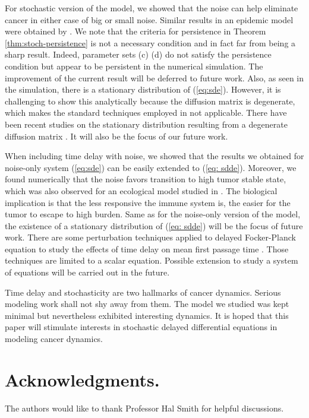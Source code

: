 \documentclass{aims}
\theoremstyle{definition}
\begin{document}
 For stochastic version of the model, we showed that the noise can
 help eliminate cancer in either case of big or small noise. Similar
 results in an epidemic model were obtained by \cite{Gray2011}. We
 note that the criteria for persistence in Theorem \ref{thm:stoch-persistence}
 is not a necessary condition and in fact far from being a sharp result.
 Indeed, parameter sets (c) (d) do not satisfy the persistence condition
 but appear to be persistent in the numerical simulation. The improvement
 of the current result will be deferred to future work. Also, as seen
 in the simulation, there is a stationary distribution of (\ref{eq:sde}).
 However, it is challenging to show this analytically because the diffusion
 matrix is degenerate, which makes the standard techniques employed
 in \cite{Wang2017,Gray2011} not applicable. There have been recent
 studies on the stationary distribution resulting from a degenerate
 diffusion matrix \cite{Lan2018}. It will also be the focus of our
 future work. 
 
 When including time delay with noise, we showed that the results we
 obtained for noise-only system (\ref{eq:sde}) can be easily extended
 to (\ref{eq: sdde}). Moreover, we found numerically that the noise
 favors transition to high tumor stable state, which was also observed
 for an ecological model studied in \cite{Zeng2012}. The biological
 implication is that the less responsive the immune system is, the
 easier for the tumor to escape to high burden. Same as for the noise-only
 version of the model, the existence of a stationary distribution of (\ref{eq: sdde}) will
 be the focus of future work. There are some perturbation techniques
 applied to delayed Focker-Planck equation to study the effects of
 time delay on mean first passage time \cite{Kuchler1992,Guillouzic1999,Frank2005}.
 Those techniques are limited to a scalar equation. Possible extension
 to study a system of equations will be carried out in the future. 
 
 Time delay and stochasticity are two hallmarks of cancer dynamics.
 Serious modeling work shall not shy away from them. The model we studied
 was kept minimal but nevertheless exhibited interesting dynamics.
 It is hoped that this paper will stimulate interests in stochastic
 delayed differential equations in modeling cancer dynamics. 
 
\section*{Acknowledgments.}
 The authors would like to thank Professor Hal Smith for helpful discussions.
% 
%
% 
\end{document}
